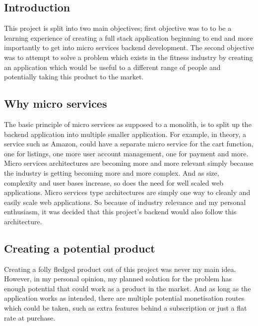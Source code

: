 \documentclass{article}
\newcommand{\vspaceconst}{-2ex}
\begin{document}
\begin{multicols}{2}
\section{Introduction}
\vspace{\vspaceconst}

This project is split into two main objectives; first objective was to to be a learning experience of creating a full stack application beginning to end and more importantly to get into micro services backend development. The second objective was to attempt to solve a problem which exists in the fitness industry by creating an application which would be useful to a different range of people and potentially taking this product to the market.


\subsection{Why micro services}
\vspace{\vspaceconst}

The basic principle of micro services as supposed to a monolith, is to split up the backend application into multiple smaller application. For example, in theory, a service such as Amazon, could have a separate micro service for the cart function, one for listings, one more user account management, one for payment and more.
Micro services architectures are becoming more and more relevant simply because the industry is getting becoming more and more complex. And as size, complexity and user bases increase, so does the need for well scaled web applications. Micro services type architectures are simply one way to cleanly and easily scale web applications. So because of industry relevance and my personal enthusiasm, it was decided that this project's backend would also follow this architecture. 

\subsection{Creating a potential product}
\vspace{\vspaceconst}

Creating a folly fledged product out of this project was never my main idea. However, in my personal opinion, my planned solution for the problem has enough potential that could work as a product in the market. And as long as the application works as intended, there are multiple potential monetisation routes which could be taken, such as extra features behind a subscription or just a flat rate at purchase.


\end{multicols}
\end{document}
